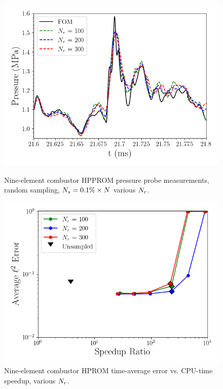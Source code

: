 \begin{figure}
	\begin{minipage}{0.49\linewidth}
		\includegraphics[width=0.99\linewidth]{Chapters/HPROMResults/Images/nineElem/deim/pressure_probe_deim_random_modes.png}
		\caption{\label{fig:nineElemDEIMProbeModes}Nine-element combustor HPPROM pressure probe measurements, random sampling, $N_s = 0.1\% \times N$ various $N_r$.}
	\end{minipage}
	\begin{minipage}{0.49\linewidth}
		\includegraphics[width=0.99\linewidth]{Chapters/HPROMResults/Images/nineElem/deim/sampled_dt5e-7_Average_errorRaw_pareto.png}
		\caption{\label{fig:nineElemPareto}Nine-element combustor HPROM time-average error vs. CPU-time speedup, various $N_r$.}
	\end{minipage}
\end{figure}

